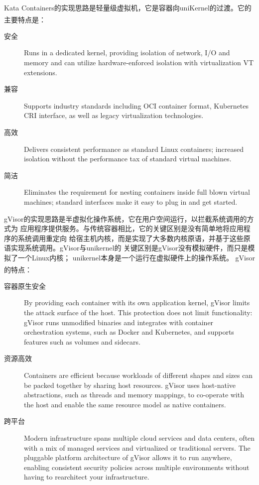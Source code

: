 \documentclass[UTF8,fontset=none,linespread=1.15]{ctexart}
\let\nosupcite\cite
\renewcommand*{\cite}[1]{\textsuperscript{\nosupcite{#1}}}
\begin{document}
Kata Containers的实现思路是轻量级虚拟机，它是容器向uniKernel的过渡。它的主要特点是\cite{bib:kata}：
\begin{description}
\item[安全] Runs in a dedicated kernel, providing isolation of network,
I/O and memory and can utilize hardware-enforced isolation with virtualization VT extensions.
\item[兼容] Supports industry standards including OCI container format,
Kubernetes CRI interface, as well as legacy virtualization technologies.
\item[高效] Delivers consistent performance as standard Linux containers;
increased isolation without the performance tax of standard virtual machines.
\item[简洁] Eliminates the requirement for nesting containers inside full
blown virtual machines; standard interfaces make it easy to plug in and get started.
\end{description}

gVisor的实现思路是半虚拟化操作系统，它在用户空间运行，以拦截系统调用的方式为
应用程序提供服务。与传统容器相比，它的关键区别是没有简单地将应用程序的系统调用重定向
给宿主机内核，而是实现了大多数内核原语，并基于这些原语实现系统调用。gVisor与unikernel的
关键区别是gVisor没有模拟硬件，而只是模拟了一个Linux内核；
unikernel本身是一个运行在虚拟硬件上的操作系统。
gVisor的特点：\cite{bib:gvisor}
\begin{description}
\item[容器原生安全] By providing each container with its own application kernel, gVisor limits the attack surface of the host. This protection does not limit functionality: gVisor runs unmodified binaries and integrates with container orchestration systems, such as Docker and Kubernetes, and supports features such as volumes and sidecars.

\item[资源高效] Containers are efficient because workloads of different shapes and sizes can be packed together by sharing host resources. gVisor uses host-native abstractions, such as threads and memory mappings, to co-operate with the host and enable the same resource model as native containers.

\item[跨平台] Modern infrastructure spans multiple cloud services and data centers, often with a mix of managed services and virtualized or traditional servers. The pluggable platform architecture of gVisor allows it to run anywhere, enabling consistent security policies across multiple environments without having to rearchitect your infrastructure.
\end{description}
\end{document}
